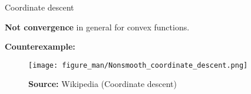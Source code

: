 \documentclass[11pt,compress,t,notes=noshow, xcolor=table]{beamer}
\begin{document}
\begin{vbframe}{Coordinate descent}
\framebreak

\textbf{Not convergence} in general for convex functions.

\medskip

\textbf{Counterexample:}

\begin{figure}
    \centering
    \texttt{[image: figure\_man/Nonsmooth\_coordinate\_descent.png]}
    \caption*{\small \textbf{Source:} Wikipedia (Coordinate descent)}
\end{figure}




%
%



\end{vbframe}
\end{document}
